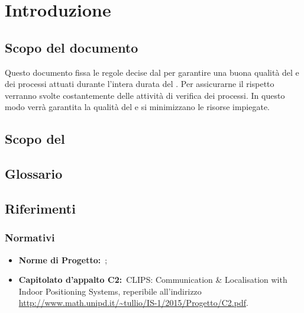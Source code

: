 
\section{Introduzione}
	\subsection{Scopo del documento}
	Questo documento fissa le regole decise dal  per garantire una buona qualità del  e dei processi attuati durante l'intera durata del . Per assicurarne il rispetto verranno svolte costantemente delle attività di verifica dei processi. In questo modo verrà garantita la qualità del  e si minimizzano le risorse impiegate.
	
	\subsection{Scopo del }
	\SCOPO
	
	\subsection{Glossario}
	\GLOSSARIO
	
	\subsection{Riferimenti} 
	\subsubsection{Normativi}
	\begin{itemize}
		\item \textbf{Norme di Progetto:}\ \NPdoc;
		\item \textbf{Capitolato d'appalto C2:}\ CLIPS: Communication \& Localisation with Indoor Positioning Systems, reperibile all'indirizzo \url{http://www.math.unipd.it/~tullio/IS-1/2015/Progetto/C2.pdf}.
	\end{itemize}
	
